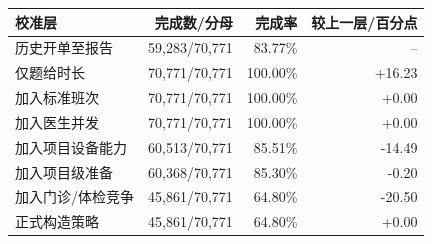 \begin{tabular}{lrrr}
\toprule
校准层 & 完成数/分母 & 完成率 & 较上一层/百分点 \\
\midrule
历史开单至报告 & 59,283/70,771 & 83.77\% & -- \\
仅题给时长 & 70,771/70,771 & 100.00\% & +16.23 \\
加入标准班次 & 70,771/70,771 & 100.00\% & +0.00 \\
加入医生并发 & 70,771/70,771 & 100.00\% & +0.00 \\
加入项目设备能力 & 60,513/70,771 & 85.51\% & -14.49 \\
加入项目级准备 & 60,368/70,771 & 85.30\% & -0.20 \\
加入门诊/体检竞争 & 45,861/70,771 & 64.80\% & -20.50 \\
正式构造策略 & 45,861/70,771 & 64.80\% & +0.00 \\
\bottomrule
\end{tabular}
